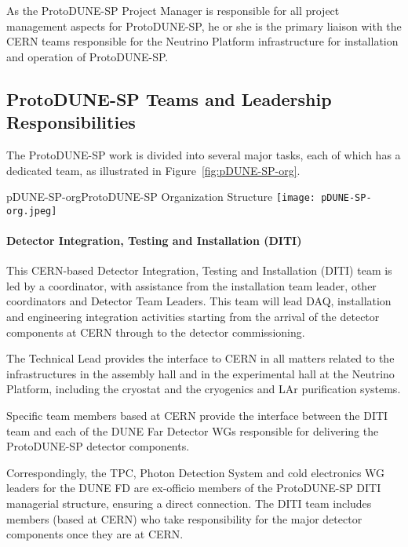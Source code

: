 As the ProtoDUNE-SP Project Manager is responsible for all project management aspects for ProtoDUNE-SP, he or she is the primary liaison with the CERN teams responsible for the Neutrino Platform infrastructure for installation and operation of ProtoDUNE-SP. 

\subsection{ProtoDUNE-SP Teams and Leadership Responsibilities}

The ProtoDUNE-SP work is divided into several major tasks, each of which has a dedicated team, as illustrated in Figure~\ref{fig:pDUNE-SP-org}.

\begin{cdrfigure}{pDUNE-SP-org}{ProtoDUNE-SP Organization Structure}
  \texttt{[image: pDUNE-SP-org.jpeg]}
\end{cdrfigure}


\paragraph{Detector Integration, Testing and Installation (DITI)}

This CERN-based Detector Integration, Testing and Installation (DITI) team is led by a coordinator, with assistance from the installation team leader, other coordinators and Detector Team Leaders.  This team will lead DAQ, installation and engineering integration activities starting from the arrival of the detector components at CERN through to the detector commissioning.

The Technical Lead provides the interface to CERN in all matters related to the infrastructures in the assembly hall and in the experimental hall at the Neutrino Platform, including the cryostat and the cryogenics and LAr purification systems.

Specific team members based at CERN provide the interface between the DITI team and each of the DUNE Far Detector WGs responsible for delivering the ProtoDUNE-SP detector components. 

Correspondingly, the TPC, Photon Detection System and cold electronics WG leaders for the DUNE FD are ex-officio members of the ProtoDUNE-SP DITI managerial structure, ensuring a direct connection. The DITI team includes members (based at CERN) who take responsibility for the major detector components once they are at CERN.


